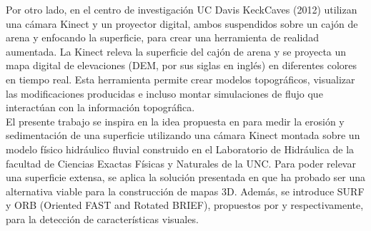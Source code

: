 Por otro lado, en el centro de investigación UC Davis KeckCaves (2012)\cite{arsandbox} utilizan una cámara Kinect y un proyector digital, ambos suspendidos sobre un cajón de arena y enfocando la superficie, para crear una herramienta de realidad aumentada. La Kinect releva la superficie del cajón de arena y se proyecta un mapa digital de elevaciones (DEM, por sus siglas en inglés) en diferentes colores en tiempo real. Esta herramienta permite crear modelos topográficos, visualizar las modificaciones producidas e incluso montar simulaciones de flujo que interactúan con la información topográfica. \\

El presente trabajo se inspira en la idea propuesta en \cite{arsandbox} para medir la erosión y sedimentación de una superficie utilizando una cámara Kinect montada sobre un modelo físico hidráulico fluvial construido en el Laboratorio de Hidráulica de la facultad de Ciencias Exactas Físicas y Naturales de la UNC. Para poder relevar una superficie extensa, se aplica la solución presentada en \cite{henry2010rgb} que ha probado ser una alternativa viable para la construcción de mapas 3D. Además, se introduce SURF y ORB (Oriented FAST and Rotated BRIEF)\cite{RubleeRKB11}, propuestos por \cite{engelhardreal} y \cite{fioraio2011realtime} respectivamente, para la detección de características visuales.

